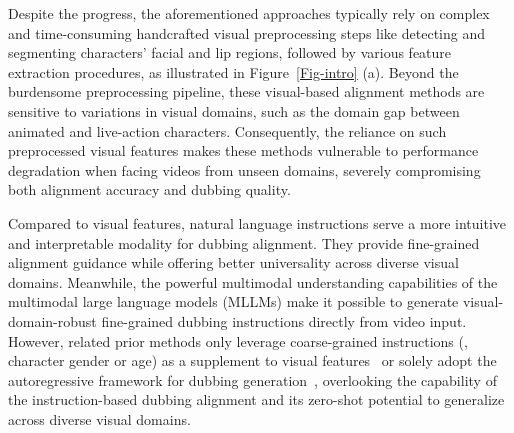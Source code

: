Despite the progress, the aforementioned approaches typically rely on complex and time-consuming handcrafted visual preprocessing steps like detecting and segmenting characters' facial and lip regions, followed by various feature extraction procedures, as illustrated in Figure~\ref{Fig-intro} (a).
Beyond the burdensome preprocessing pipeline, these visual-based alignment methods are sensitive to variations in visual domains, such as the domain gap between animated and live-action characters.
Consequently, the reliance on such preprocessed visual features makes these methods vulnerable to performance degradation when facing videos from unseen domains, severely compromising both alignment accuracy and dubbing quality.


Compared to visual features, natural language instructions serve a more intuitive and interpretable modality for dubbing alignment.
They provide fine-grained alignment guidance while offering better universality across diverse visual domains.
Meanwhile, the powerful multimodal understanding capabilities of the multimodal large language models (MLLMs) make it possible to generate visual-domain-robust fine-grained dubbing instructions directly from video input.
However, related prior methods only leverage coarse-grained instructions (\eg, character gender or age) as a supplement to visual features~\cite{deepdubber} or solely adopt the autoregressive framework for dubbing generation~\cite{voicecraftdub}, overlooking the capability of the instruction-based dubbing alignment and its zero-shot potential to generalize across diverse visual domains.


